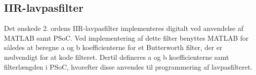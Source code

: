 \subsection{IIR-lavpasfilter}
Det ønskede 2. ordens IIR-lavpasfilter implementeres digitalt ved anvendelse af MATLAB samt PSoC.
Ved implementering af dette filter benyttes MATLAB for således at beregne a og b koefficienterne for et Butterworth filter, der er nødvendigt for at kode filteret. Dertil defineres a og b koefficienterne samt filterlængden i PSoC, hvorefter disse anvendes til programmering af lavpasfilteret. 